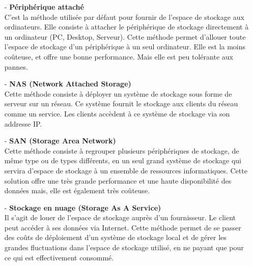 \begin{itemize}
	\item[-] \textbf{P\'eriph\'erique attach\'e\cite{MethodesEtTechnologies}\cite{MethodesEtTechnologies1}}\\
	C'est la m\'ethode utilis\'ee par d\'efaut pour fournir de l'espace de stockage aux ordinateurs. Elle consiste \`a attacher le p\'eriph\'erique de stockage directement \`a un ordinateur (PC, Desktop, Serveur). Cette m\'ethode permet d'allouer toute l'espace de stockage d'un p\'eriph\'erique \`a un seul ordinateur. Elle est la moins co\^uteuse, et offre une bonne performance. Mais elle est peu tol\'erante aux pannes. \\

	\item[-] \textbf{NAS (Network Attached Storage)}\\
	Cette m\'ethode consiste \`a d\'eployer un syst\`eme de stockage sous forme de serveur sur un r\'eseau. Ce syst\`eme fournit le stockage aux clients du r\'eseau comme un service. Les clients acc\`edent \`a ce syst\`eme de stockage via son addresse IP. \\

	\item[-] \textbf{SAN (Storage Area Network)\cite{MethodesEtTechnologies}\cite{MethodesEtTechnologies1}} \\
	Cette m\'ethode consiste \`a regrouper plusieurs p\'eriph\'eriques de stockage, de m\^eme type ou de types diff\'erents, en un seul grand syst\`eme de stockage qui servira d'espace de stockage \`a un ensemble de ressources informatiques. Cette solution offre une tr\`es grande performance et une haute disponibilit\'e des donn\'ees mais, elle est \'egalement tr\`es co\^uteuse.\\

	\item[-] \textbf{Stockage en nuage (Storage As A Service)\cite{MethodesEtTechnologies}\cite{MethodesEtTechnologies1}} \\
	Il s'agit de louer de l'espace de stockage aupr\`es d'un fournisseur. Le client peut acc\'eder \`a ses donn\'ees via Internet. Cette m\'ethode permet de se passer des co\^uts de d\'eploiement d'un syst\`eme de stockage local et de g\'erer les grandes fluctuations dans l'espace de stockage utilis\'e, en ne payant que pour ce qui est effectivement consomm\'e.\\

\end{itemize}

